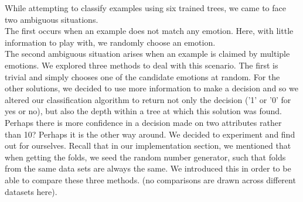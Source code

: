 While attempting to classify examples using six trained trees, we came to face two ambiguous situations.\\
The first occurs when an example does not match any emotion.
Here, with little information to play with, we randomly choose an emotion.\\
The second ambiguous situation arises when an example is claimed by multiple emotions.
We explored three methods to deal with this scenario.
The first is trivial and simply chooses one of the candidate emotions at random.
For the other solutions, we decided to use more information to make a decision and so we altered our classification algorithm
to return not only the decision ('1' or '0' for yes or no), but also the depth within a tree at which this solution was found.
Perhaps there is more confidence in a decision made on two attributes rather than 10? Perhaps it is the other way around.
We decided to experiment and find out for ourselves. Recall that in our implementation section, we mentioned that when getting
the folds, we seed the random number generator, such that folds from the same data sets are always the same. We introduced this
in order to be able to compare these three methods. (no comparisons are drawn across different datasets here).\\






